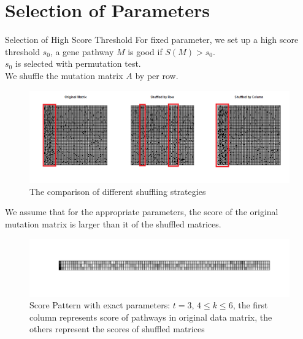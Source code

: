 \documentclass[xcolor=dvipsnames]{beamer}
\begin{document}
\section{Selection of Parameters}
\begin{frame}{Selection of High Score Threshold}
For fixed parameter, we set up a high score threshold $s_0$, a gene pathway $M$ is good if $S(M)>s_0$.\\
$s_0$ is selected with permutation test.\\
We shuffle the mutation matrix $A$ by per row.\\
\begin{figure}
\centering
\includegraphics[width=0.99\linewidth]{shuffle.png}
\caption{The comparison of different shuffling strategies}
\end{figure}
\end{frame}
\begin{frame}
We assume that for the appropriate parameters, the score of the original mutation matrix is larger than it of the shuffled matrices.\\
\begin{figure}
\centering
\includegraphics[width=0.99\linewidth]{permint.png}
\caption{Score Pattern with exact parameters: $t=3$, $4\leqslant k\leqslant 6$, the first column represents score of pathways in original data matrix, the others represent the scores of shuffled matrices}
\end{figure}
\end{frame}
\end{document}
